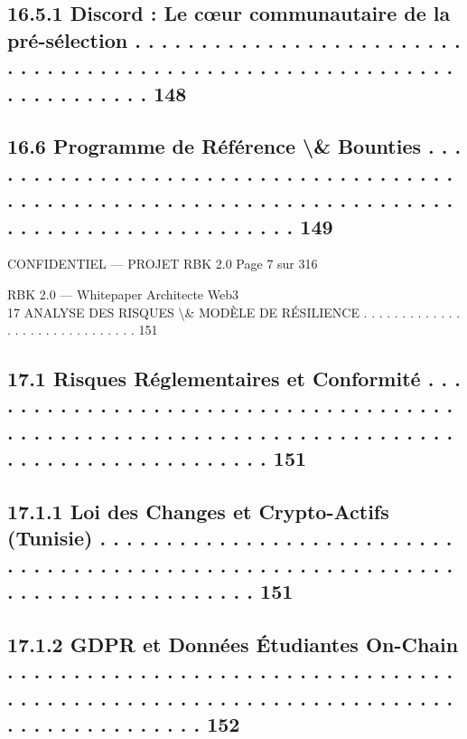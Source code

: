 \subsection{16.5.1              Discord : Le cœur communautaire de la pré-sélection . . . . . . . . . . . . . . . . . . . . . . . . . . . . . . . . . . . . . . . . . . . . . . . . . . . . . . . . . . . . . . . . . . . . . . 148}
\subsection{16.6    Programme de Référence \textbackslash{}& Bounties . . . . . . . . . . . . . . . . . . . . . . . . . . . . . . . . . . . . . . . . . . . . . . . . . . . . . . . . . . . . . . . . . . . . . . . . . . . . . . . . . . . . . . . . . . . . . 149}
\vspace{0.5em}
\vspace{0.5em}
\vspace{0.5em}
\begin{confidential}CONFIDENTIEL — PROJET RBK 2.0                                                                              Page 7 sur 316\end{confidential}
RBK 2.0 — Whitepaper Architecte Web3\\
\vspace{0.5em}
\vspace{0.5em}
17    ANALYSE DES RISQUES \textbackslash{}& MODÈLE DE RÉSILIENCE . . . . . . . . . . . . . . . . . . . . . . . . . . . . . . 151\\
\subsection{17.1    Risques Réglementaires et Conformité . . . . . . . . . . . . . . . . . . . . . . . . . . . . . . . . . . . . . . . . . . . . . . . . . . . . . . . . . . . . . . . . . . . . . . . . . . . . . . . . . . . . . . . . . . . 151}
\subsection{17.1.1            Loi des Changes et Crypto-Actifs (Tunisie) . . . . . . . . . . . . . . . . . . . . . . . . . . . . . . . . . . . . . . . . . . . . . . . . . . . . . . . . . . . . . . . . . . . . . . . . . . . . . . . . 151}
\subsection{17.1.2            GDPR et Données Étudiantes On-Chain . . . . . . . . . . . . . . . . . . . . . . . . . . . . . . . . . . . . . . . . . . . . . . . . . . . . . . . . . . . . . . . . . . . . . . . . . . . . . . . . . . . 152}
